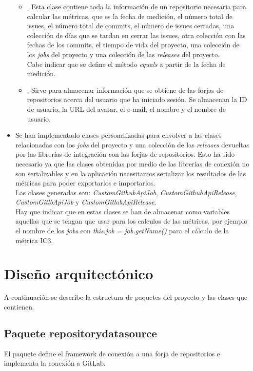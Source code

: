 \begin{itemize}
\begin{itemize}
	\item {}. Esta clase contiene toda la información de un repositorio necesaria para calcular las métricas, que es la fecha de medición, el número total de issues, el número total de commits, el número de issues cerradas, una colección de días que se tardan en cerrar las issues, otra colección con las fechas de los commits, el tiempo de vida del proyecto, una colección de los \textit{jobs} del proyecto y una colección de las \textit{releases} del proyecto. \\
	Cabe indicar que se define el método \textit{equals} a partir de la fecha de medición.
	\item {}. Sirve para almacenar información que se obtiene de las forjas de repositorios acerca del usuario que ha iniciado sesión. Se almacenan la ID de usuario, la URL del avatar, el e-mail, el nombre y el nombre de usuario.
	\end{itemize}
	\item Se han implementado clases personalizadas para envolver a las clases relacionadas con los \textit{jobs} del proyecto y una colección de las \textit{releases} devueltas por las librerías de integración con las forjas de repositorios. Esto ha sido necesario ya que las clases obtenidas por medio de las librerías de conexión no son serializables y en la aplicación necesitamos serializar los resultados de las métricas para poder exportarlos e importarlos.\\
	Las clases generadas son: \textit{CustomGithubApiJob}, \textit{CustomGithubApiRelease}, \textit{CustomGitlbApiJob} y \textit{CustomGitlabApiRelease}.\\
	Hay que indicar que en estas clases se han de almacenar como variables aquellas que se tengan que usar para los calculos de las métricas, por ejemplo el nombre de los \textit{jobs} con \textit{this.job = job.getName()} para el cálculo de la métrica IC3.
\end{itemize}
	
\section{Diseño arquitectónico}
A continuación se describe la estructura de paquetes del proyecto y las clases que contienen.

\subsection{Paquete repositorydatasource}
El paquete define el framework de conexión a una forja de repositorios e implementa la conexión a GitLab.


